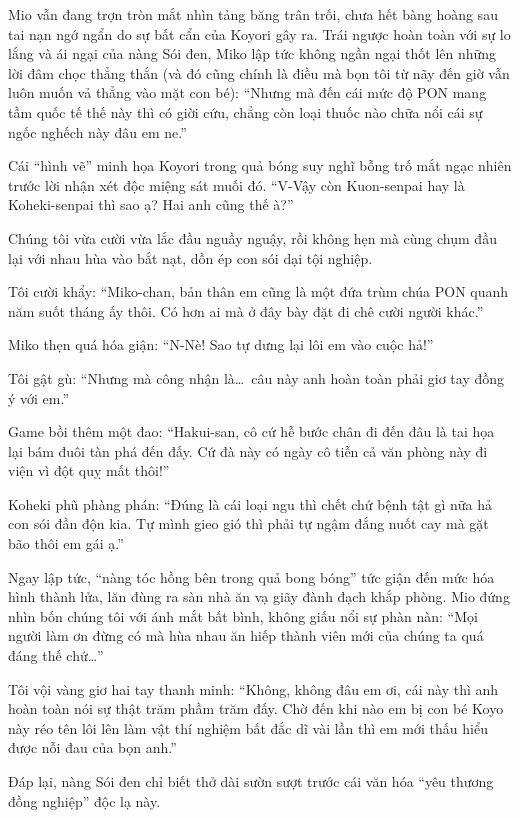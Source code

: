 \documentclass[../main.tex]{subfiles}
\begin{document}
Mio vẫn đang trợn tròn mắt nhìn tảng băng trân trối, chưa hết bàng hoàng sau tai nạn ngớ ngẩn do sự bất cẩn của Koyori gây ra. Trái ngược hoàn toàn với sự lo lắng và ái ngại của nàng Sói đen, Miko lập tức không ngần ngại thốt lên những lời đâm chọc thẳng thắn (và đó cũng chính là điều mà bọn tôi từ nãy đến giờ vẫn luôn muốn vả thẳng vào mặt con bé): ``Nhưng mà đến cái mức độ PON mang tầm quốc tế thế này thì có giời cứu, chẳng còn loại thuốc nào chữa nổi cái sự ngốc nghếch này đâu em ne.''

Cái ``hình vẽ'' minh họa Koyori trong quả bóng suy nghĩ bỗng trố mắt ngạc nhiên trước lời nhận xét độc miệng sát muối đó. ``V-Vậy còn Kuon-senpai hay là Koheki-senpai thì sao ạ? Hai anh cũng thế à?''

Chúng tôi vừa cười vừa lắc đầu nguầy nguậy, rồi không hẹn mà cùng chụm đầu lại với nhau hùa vào bắt nạt, dồn ép con sói dại tội nghiệp.

Tôi cười khẩy: ``Miko-chan, bản thân em cũng là một đứa trùm chúa PON quanh năm suốt tháng ấy thôi. Có hơn ai mà ở đây bày đặt đi chê cười người khác.''

Miko thẹn quá hóa giận: ``N-Nè! Sao tự dưng lại lôi em vào cuộc hả!''

Tôi gật gù: ``Nhưng mà công nhận là\dots\ câu này anh hoàn toàn phải giơ tay đồng ý với em.''

Game bồi thêm một đao: ``Hakui-san, cô cứ hễ bước chân đi đến đâu là tai họa lại bám đuôi tàn phá đến đấy. Cứ đà này có ngày cô tiễn cả văn phòng này đi viện vì đột quỵ mất thôi!''

Koheki phũ phàng phán: ``Đúng là cái loại ngu thì chết chứ bệnh tật gì nữa hả con sói đần độn kia. Tự mình gieo gió thì phải tự ngậm đắng nuốt cay mà gặt bão thôi em gái ạ.''

Ngay lập tức, ``nàng tóc hồng bên trong quả bong bóng'' tức giận đến mức hóa hình thành lửa, lăn đùng ra sàn nhà ăn vạ giãy đành đạch khắp phòng. Mio đứng nhìn bốn chúng tôi với ánh mắt bất bình, không giấu nổi sự phàn nàn: ``Mọi người làm ơn đừng có mà hùa nhau ăn hiếp thành viên mới của chúng ta quá đáng thế chứ\dots''

Tôi vội vàng giơ hai tay thanh minh: ``Không, không đâu em ơi, cái này thì anh hoàn toàn nói sự thật trăm phầm trăm đấy. Chờ đến khi nào em bị con bé Koyo này réo tên lôi lên làm vật thí nghiệm bất đắc dĩ vài lần thì em mới thấu hiểu được nỗi đau của bọn anh.''

Đáp lại, nàng Sói đen chỉ biết thở dài sườn sượt trước cái văn hóa ``yêu thương đồng nghiệp'' độc lạ này.
\end{document}
